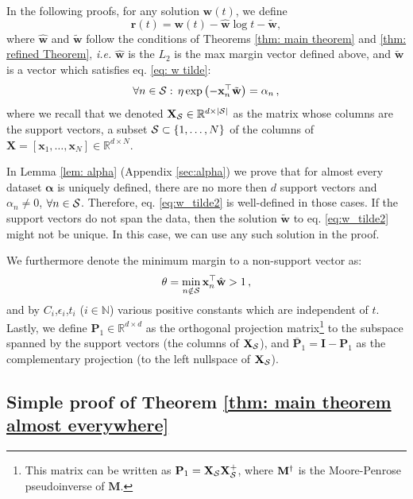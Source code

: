\documentclass[twoside,11pt,english]{article}
\begin{document}
In the following proofs, for any solution $\mathbf{w}\left(t\right)$,
we define 
\[
\mathbf{r}\left(t\right)=\mathbf{w}\left(t\right)-\hat{\mathbf{w}}\log t-\tilde{\mathbf{w}},
\]
where $\hat{\mathbf{w}}$ and $\tilde{\mathbf{w}}$ follow the conditions
of Theorems \ref{thm: main theorem} and \ref{thm: refined Theorem},
\emph{i.e.} $\hat{\mathbf{w}}$ is the $L_{2}$ is the max margin vector defined above, and $\tilde{\mathbf{w}}$ is a vector which satisfies eq. \ref{eq: w tilde}:
\begin{equation}
\forall n\in\mathcal{S}:\,\eta\exp\left(-\mathbf{x}_{n}^{\top}\tilde{\mathbf{w}}\right)=\alpha_{n}\,,\label{eq:w_tilde2}
\end{equation}
where we recall that we denoted $\mathbf{X}_{\mathcal{\mathcal{S}}}\in\mathbb{R}^{d\times\left|\mathcal{S}\right|}$
as the matrix whose columns are the support vectors, a subset $\mathcal{S}\subset\left\{ 1,\dots,N\right\} $
of the columns of $\mathbf{X}=\left[\mathbf{x}_{1},\dots,\mathbf{x}_{N}\right]\in\mathbb{R}^{d\times N}$.

In Lemma \ref{lem: alpha} (Appendix \ref{sec:alpha}) we prove that
for almost every dataset $\boldsymbol{\alpha}$ is uniquely defined,
there are no more then $d$ support vectors and $\alpha_{n}\neq0$,
$\forall n\in\mathcal{S}$. Therefore, eq. \ref{eq:w_tilde2} is well-defined
in those cases. If the support vectors do not span the data, then
the solution $\tilde{\mathbf{w}}$ to eq. \ref{eq:w_tilde2} might
not be unique. In this case, we can use any such solution in the proof.

We furthermore denote the minimum margin to a non-support vector as:
\begin{equation}
\theta=\min_{n\notin\mathcal{S}}\mathbf{x}_{n}^{\top}\hat{\mathbf{w}}>1\,,\label{eq: v1 SVM}
\end{equation}
and by $C_{i}$,$\epsilon_{i}$,$t_{i}$ (\textbf{$i\in\mathbb{N}$})
various positive constants which are independent of $t$. Lastly,
we define $\mathbf{P}_{1}\in\mathbb{R}^{d\times d}$ as the orthogonal
projection matrix\footnote{This matrix can be written as $\mathbf{P}_{1}=\mathbf{X}_{\mathcal{S}}\mathbf{X}_{\mathcal{S}}^{+}$,
where $\mathbf{M}^{\dagger}$ is the Moore-Penrose pseudoinverse of
$\mathbf{M}$. } to the subspace spanned by the support vectors (the columns of $\mathbf{X}_{\mathcal{S}}$),
and $\bar{\mathbf{P}}_{1}=\mathbf{I}-\mathbf{P}_{1}$ as the complementary
projection (to the left nullspace of $\mathbf{X}_{\mathcal{S}}$).



\subsection{Simple proof of Theorem \ref{thm: main theorem almost everywhere}}%
\end{document}
